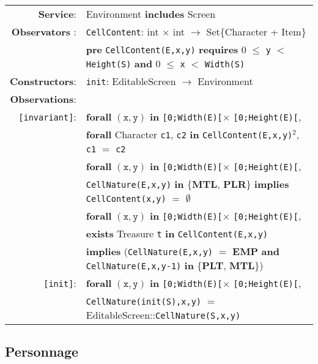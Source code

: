 \documentclass{article}
\begin{document}
\begin{tabular}{rl}
\textbf{Service}: & Environment \textbf{includes} Screen
\\ \textbf{Observators} : & \texttt{CellContent}:
\textrm{int} $\times$ \textrm{int} $\rightarrow$
\textrm{Set\{Character + Item\}} \\
& \quad \textbf{pre } \texttt{CellContent(E,x,y)} \textbf{ requires } 0 $\leq$ \texttt{y} $<$ \texttt{Height(S)} \textbf{ and } 0 $\leq$ \texttt{x} $<$ \texttt{Width(S)}\\
\textbf{Constructors}: & \texttt{init}: \textrm{EditableScreen} $\rightarrow$ \textrm{Environment} \\
\textbf{Observations}: \\
\texttt{[invariant]}: & \textbf{forall} $(\mathtt{x},\mathtt{y})$ \textbf{in} \texttt{[0;Width(E)[}$\times$ \texttt{[0;Height(E)[},~\\ & \quad\quad \textbf{forall} \textrm{Character} \texttt{c1}, \texttt{c2} \textbf{in} \texttt{CellContent(E,x,y)}$^2$, \texttt{c1} $=$ \texttt{c2} \\
& \textbf{forall} $(\mathtt{x},\mathtt{y})$ \textbf{in} \texttt{[0;Width(E)[}$\times$ \texttt{[0;Height(E)[},~\\ & \quad\quad \texttt{CellNature(E,x,y)} \textbf{in} \{\textbf{MTL}, \textbf{PLR}\} \textbf{implies} \texttt{CellContent(x,y)} $=$ $\emptyset$  \\
& \textbf{forall} $(\mathtt{x},\mathtt{y})$ \textbf{in} \texttt{[0;Width(E)[}$\times$ \texttt{[0;Height(E)[},~\\ & \quad\quad \textbf{exists} \textrm{Treasure} \texttt{t} \textbf{in} \texttt{CellContent(E,x,y)}  \\ & \quad\quad \textbf{implies} (\texttt{CellNature(E,x,y)} $=$ \textbf{EMP} \textbf{and} \texttt{CellNature(E,x,y-1)} \textbf{in} \{\textbf{PLT}, \textbf{MTL}\})\\
                        \texttt{[init]}: & \textbf{forall} $(\mathtt{x},\mathtt{y})$ \textbf{in} \texttt{[0;Width(E)[}$\times$ \texttt{[0;Height(E)[},~\\ & \quad\quad
                                \texttt{CellNature(init(S),x,y)} $=$ \textrm{EditableScreen}::\texttt{CellNature(S,x,y)} \\

                        
\end{tabular}


\subsection*{Personnage}
\end{document}
